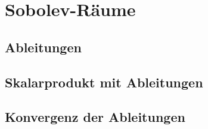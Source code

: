 %
%
%
\section{Sobolev-Räume
\label{buch:skalarprodukt:section:sobolev}}

\subsection{Ableitungen}

\subsection{Skalarprodukt mit Ableitungen}

\subsection{Konvergenz der Ableitungen}





